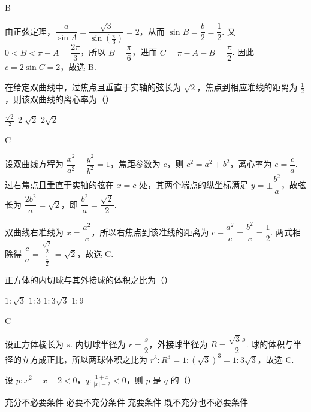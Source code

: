 \begin{answer}
B
\end{answer}

\begin{solution}
由正弦定理，\(\dfrac{a}{\sin A}=\dfrac{\sqrt{3}}{\sin(\frac{\pi}{3})}=2\)，从而 \(\sin B=\dfrac{b}{2}=\dfrac12\). 又 \(0<B<\pi-A=\dfrac{2\pi}{3}\)，所以 \(B=\dfrac{\pi}{6}\)，进而 \(C=\pi-A-B=\dfrac{\pi}{2}\). 因此 \(c=2\sin C=2\)，故选 B.
\end{solution}

\begin{problem}
在给定双曲线中，过焦点且垂直于实轴的弦长为 \(\sqrt{2}\)，焦点到相应准线的距离为 \(\frac{1}{2}\)，则该双曲线的离心率为（\quad）

\choices
    {\(\frac{\sqrt{2}}{2}\)}
    {\(2\)}
    {\(\sqrt{2}\)}
    {\(2 \sqrt{2}\)}
\end{problem}

\begin{answer}
C
\end{answer}

\begin{solution}
设双曲线方程为 \(\dfrac{x^2}{a^2}-\dfrac{y^2}{b^2}=1\)，焦距参数为 \(c\)，则 \(c^2=a^2+b^2\)，离心率为 \(e=\dfrac ca\). 过右焦点且垂直于实轴的弦在 \(x=c\) 处，其两个端点的纵坐标满足 \(y=\pm\dfrac{b^2}{a}\)，故弦长为 \(\dfrac{2b^2}{a}=\sqrt{2}\)，即 \(\dfrac{b^2}{a}=\dfrac{\sqrt{2}}{2}\).

双曲线右准线为 \(x=\dfrac{a^2}{c}\)，所以右焦点到该准线的距离为 \(c-\dfrac{a^2}{c}=\dfrac{b^2}{c}=\dfrac12\). 两式相除得 \(\dfrac ca=\dfrac{\frac{\sqrt{2}}{2}}{\frac{1}{2}}=\sqrt{2}\)，故选 C.
\end{solution}

\begin{problem}
正方体的内切球与其外接球的体积之比为（\quad）

\choices
    {\( 1 : \sqrt{3} \)}
    {\(1:3\)}
    {\(1:3\sqrt{3}\)}
    {\(1:9\)}
\end{problem}

\begin{answer}
C
\end{answer}

\begin{solution}
设正方体棱长为 \(s\). 内切球半径为 \(r=\dfrac{s}{2}\)，外接球半径为 \(R=\dfrac{\sqrt{3}s}{2}\). 球的体积与半径的立方成正比，所以两球体积之比为 \(r^3:R^3=1:(\sqrt{3})^3=1:3\sqrt{3}\)，故选 C.
\end{solution}

\begin{problem}
设 \( p: x^2 - x - 2 < 0 \)，\( q: \frac{1 + x}{|x| - 2} < 0 \)，则 \( p \) 是 \( q \) 的（\quad）

\choices
    {充分不必要条件}
    {必要不充分条件}
    {充要条件}
    {既不充分也不必要条件}
\end{problem}

